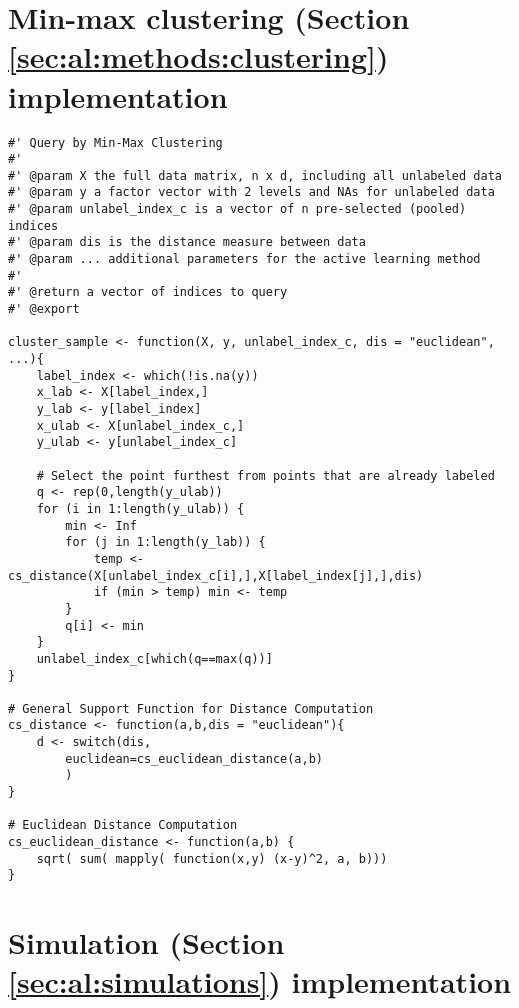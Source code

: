 \section{Min-max clustering (Section \ref{sec:al:methods:clustering}) 
implementation}
\label{sec:appendicies:al:clustering}
{
\begin{lstlisting}
#' Query by Min-Max Clustering
#'
#' @param X the full data matrix, n x d, including all unlabeled data
#' @param y a factor vector with 2 levels and NAs for unlabeled data
#' @param unlabel_index_c is a vector of n pre-selected (pooled) indices
#' @param dis is the distance measure between data
#' @param ... additional parameters for the active learning method
#'
#' @return a vector of indices to query
#' @export

cluster_sample <- function(X, y, unlabel_index_c, dis = "euclidean", ...){
	label_index <- which(!is.na(y))
	x_lab <- X[label_index,]
	y_lab <- y[label_index]
	x_ulab <- X[unlabel_index_c,]
	y_ulab <- y[unlabel_index_c]
	
	# Select the point furthest from points that are already labeled
	q <- rep(0,length(y_ulab))
	for (i in 1:length(y_ulab)) {
		min <- Inf
		for (j in 1:length(y_lab)) {
			temp <- cs_distance(X[unlabel_index_c[i],],X[label_index[j],],dis)
			if (min > temp) min <- temp
		}
		q[i] <- min
	}
	unlabel_index_c[which(q==max(q))]
}

# General Support Function for Distance Computation
cs_distance <- function(a,b,dis = "euclidean"){
	d <- switch(dis,
		euclidean=cs_euclidean_distance(a,b)
		)
}

# Euclidean Distance Computation
cs_euclidean_distance <- function(a,b) {
	sqrt( sum( mapply( function(x,y) (x-y)^2, a, b)))
}
\end{lstlisting}
}

\section{Simulation (Section \ref{sec:al:simulations}) implementation}
\label{sec:appendicies:al:simulations}

